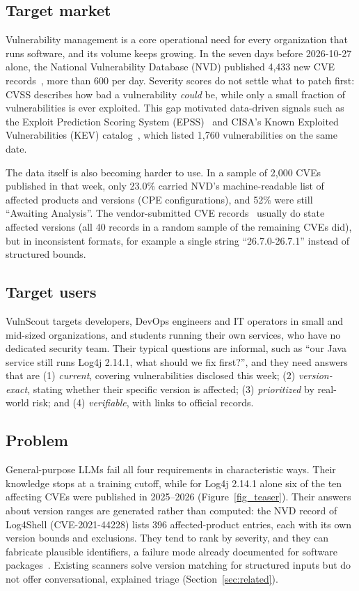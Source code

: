 \documentclass[final]{cvpr}
\begin{document}
\subsection{Target market}
Vulnerability management is a core operational need for every organization that runs software, and its volume keeps growing. In the seven days before 2026-10-27 alone, the National Vulnerability Database (NVD) published 4,433 new CVE records~\cite{nvd}, more than 600 per day. Severity scores do not settle what to patch first: CVSS describes how bad a vulnerability \emph{could} be, while only a small fraction of vulnerabilities is ever exploited. This gap motivated data-driven signals such as the Exploit Prediction Scoring System (EPSS)~\cite{jacobs2019epss,jacobs2023epss} and CISA's Known Exploited Vulnerabilities (KEV) catalog~\cite{cisakev}, which listed 1,760 vulnerabilities on the same date.

The data itself is also becoming harder to use. In a sample of 2,000 CVEs published in that week, only 23.0\% carried NVD's machine-readable list of affected products and versions (CPE configurations), and 52\% were still ``Awaiting Analysis''. The vendor-submitted CVE records~\cite{cvelistv5} usually do state affected versions (all 40 records in a random sample of the remaining CVEs did), but in inconsistent formats, for example a single string ``26.7.0-26.7.1'' instead of structured bounds.

\subsection{Target users}
VulnScout targets developers, DevOps engineers and IT operators in small and mid-sized organizations, and students running their own services, who have no dedicated security team. Their typical questions are informal, such as ``our Java service still runs Log4j 2.14.1, what should we fix first?'', and they need answers that are (1) \emph{current}, covering vulnerabilities disclosed this week; (2) \emph{version-exact}, stating whether their specific version is affected; (3) \emph{prioritized} by real-world risk; and (4) \emph{verifiable}, with links to official records.

\subsection{Problem}
General-purpose LLMs fail all four requirements in characteristic ways. Their knowledge stops at a training cutoff, while for Log4j 2.14.1 alone six of the ten affecting CVEs were published in 2025--2026 (Figure~\ref{fig_teaser}). Their answers about version ranges are generated rather than computed: the NVD record of Log4Shell (CVE-2021-44228) lists 396 affected-product entries, each with its own version bounds and exclusions. They tend to rank by severity, and they can fabricate plausible identifiers, a failure mode already documented for software packages~\cite{spracklen2025package}. Existing scanners solve version matching for structured inputs but do not offer conversational, explained triage (Section~\ref{sec:related}).
\end{document}
